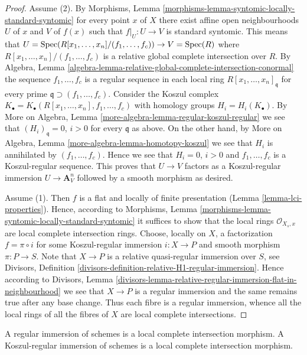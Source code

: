 \begin{proof}
Assume (2). By
Morphisms, Lemma \ref{morphisms-lemma-syntomic-locally-standard-syntomic}
for every point $x$ of $X$ there exist affine open neighbourhoods
$U$ of $x$ and $V$ of $f(x)$ such that $f|_U : U \to V$ is standard syntomic.
This means that $U = \mathop{\rm Spec}(R[x_1, \ldots, x_n]/(f_1, \ldots, f_c))
\to V = \mathop{\rm Spec}(R)$ where $R[x_1, \ldots, x_n]/(f_1, \ldots, f_c)$ is a
relative global complete intersection over $R$. By
Algebra,
Lemma \ref{algebra-lemma-relative-global-complete-intersection-conormal}
the sequence $f_1, \ldots, f_c$ is a regular sequence in each local
ring $R[x_1, \ldots, x_n]_{\mathfrak q}$ for every prime
$\mathfrak q \supset (f_1, \ldots, f_c)$. Consider the Koszul complex
$K_\bullet = K_\bullet(R[x_1, \ldots, x_n], f_1, \ldots, f_c)$
with homology groups $H_i = H_i(K_\bullet)$. By
More on Algebra, Lemma \ref{more-algebra-lemma-regular-koszul-regular}
we see that $(H_i)_{\mathfrak q} = 0$, $i > 0$ for every $\mathfrak q$
as above. On the other hand, by
More on Algebra, Lemma \ref{more-algebra-lemma-homotopy-koszul}
we see that $H_i$ is annihilated by $(f_1, \ldots, f_c)$. Hence we
see that $H_i = 0$, $i > 0$ and $f_1, \ldots, f_c$ is a Koszul-regular
sequence. This proves that $U \to V$ factors as a Koszul-regular
immersion $U \to \mathbf{A}^n_V$ followed by a smooth morphism as desired.

\medskip\noindent
Assume (1). Then $f$ is a flat and locally of finite presentation
(Lemma \ref{lemma-lci-properties}).
Hence, according to
Morphisms, Lemma \ref{morphisms-lemma-syntomic-locally-standard-syntomic}
it suffices to show that the local rings $\mathcal{O}_{X_s, x}$
are local complete intersection rings. Choose, locally on $X$, a factorization
$f = \pi \circ i$ for some Koszul-regular immersion $i : X \to P$
and smooth morphism $\pi : P \to S$. Note that $X \to P$ is
a relative quasi-regular immersion over $S$, see
Divisors, Definition \ref{divisors-definition-relative-H1-regular-immersion}.
Hence according to
Divisors,
Lemma \ref{divisors-lemma-relative-regular-immersion-flat-in-neighbourhood}
we see that $X \to P$ is a regular immersion and the same remains true
after any base change. Thus each fibre is a regular immersion, whence
all the local rings of all the fibres of $X$ are local complete intersections.
\end{proof}

\begin{lemma}
\label{lemma-regular-immersion-lci}
A regular immersion of schemes is a local complete intersection morphism.
A Koszul-regular immersion of schemes is a local complete intersection
morphism.
\end{lemma}

